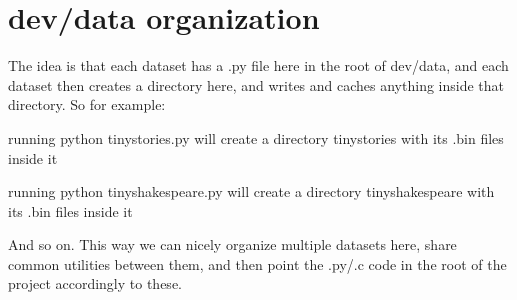 \chapter{dev/data organization}
\hypertarget{md_dev_2data_2README}{}\label{md_dev_2data_2README}
\label{md_dev_2data_2README_autotoc_md40}%
%


The idea is that each dataset has a .py file here in the root of {\ttfamily dev/data}, and each dataset then creates a directory here, and writes and caches anything inside that directory. So for example\+:


\begin{DoxyItemize}
\item running {\ttfamily python tinystories.\+py} will create a directory {\ttfamily tinystories} with its .bin files inside it
\item running {\ttfamily python tinyshakespeare.\+py} will create a directory {\ttfamily tinyshakespeare} with its .bin files inside it
\end{DoxyItemize}

And so on. This way we can nicely organize multiple datasets here, share common utilities between them, and then point the .py/.c code in the root of the project accordingly to these. 